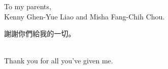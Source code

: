 
\cleardoublepage

\begin{dedication}
  \vspace{4cm}
  \begin{center}
    To my parents, \\
    Kenny Ghen-Yue Liao and Misha Fang-Chih Chou. 
    
    \begin{CJK*}{UTF8}{bsmi}
      謝謝你們給我的一切。
    \end{CJK*}
    \\ Thank you for all you've given me. 
  \end{center}
\end{dedication}
